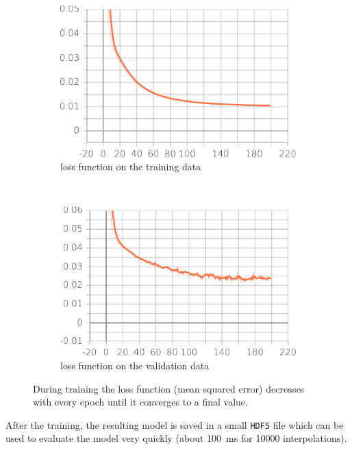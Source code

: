 \begin{figure}[h] %
	\centering
	\begin{subfigure}[t]{0.5\textwidth}
		\centering
		\includegraphics[width=\linewidth]{images/loss.pdf}
		\caption{loss function on the training data}
		\label{fig:loss}
	\end{subfigure}%
	~ 
	\begin{subfigure}[t]{0.5\textwidth}
		\centering
		\includegraphics[width=\linewidth]{images/val_loss.pdf}
		\caption{loss function on the validation data}
		\label{fig:val_loss}
	\end{subfigure}
	\caption{During training the loss function (mean squared error) decreases with every epoch until it converges to a final value.}
	\label{fig:loss_val}
	
\end{figure}

After the training, the resulting model is saved in a small \texttt{HDF5} file which can be used to evaluate the model very quickly (about \SI{100}{\milli\second} for \num{10000} interpolations).


